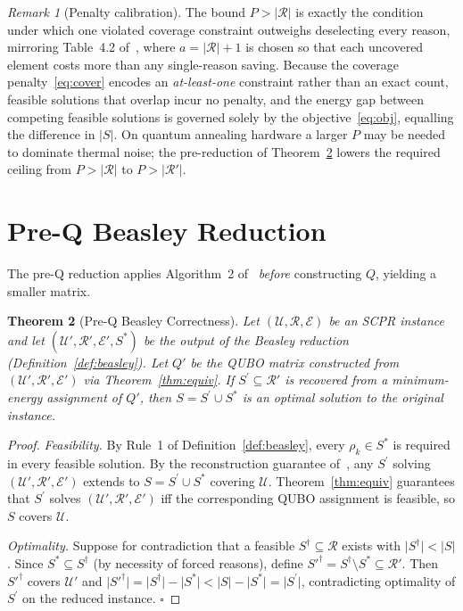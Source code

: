 \documentclass[11pt,a4paper]{article}
\theoremstyle{plain}
\newtheorem{theorem}{Theorem}[section]
\theoremstyle{definition}
\theoremstyle{remark}
\newtheorem{remark}[theorem]{Remark}
\newcommand{\U}{\mathcal{U}}
\newcommand{\R}{\mathcal{R}}
\newcommand{\E}{\mathcal{E}}
\newcommand{\Sstar}{S^{*}}
\newcommand{\Sprime}{S^{\prime}}
\newcommand{\SCPR}{\textup{SCPR}}
\newcommand{\QUBO}{\textup{QUBO}}
\newcommand{\abs}[1]{\lvert #1 \rvert}
\begin{document}
\begin{remark}[Penalty calibration]
The bound $P > \abs{\R}$ is exactly the condition under which one violated coverage
constraint outweighs deselecting every reason, mirroring Table~4.2
of~\cite{babatunde2025thesis}, where $a = \abs{\R} + 1$ is chosen so that each
uncovered element costs more than any single-reason saving. Because the coverage
penalty~\eqref{eq:cover} encodes an \emph{at-least-one} constraint rather than an
exact count, feasible solutions that overlap incur no penalty, and the energy gap
between competing feasible solutions is governed solely by the
objective~\eqref{eq:obj}, equalling the difference in $\abs{S}$. On quantum
annealing hardware a larger $P$ may be needed to dominate thermal noise; the
pre-reduction of Theorem~\ref{thm:preq} lowers the required ceiling from
$P > \abs{\R}$ to $P > \abs{\R'}$.
\end{remark}

\section{Pre-Q Beasley Reduction}
\label{sec:preq}

The pre-Q reduction applies Algorithm~2 of~\cite{babatunde2025thesis}
\emph{before} constructing $Q$, yielding a smaller matrix.

\begin{theorem}[Pre-Q Beasley Correctness]
\label{thm:preq}
Let $(\U, \R, \E)$ be an \SCPR{} instance and let
$(\U', \R', \E', \Sstar)$ be the output of the Beasley reduction
(Definition~\ref{def:beasley}).
Let $Q'$ be the \QUBO{} matrix constructed from $(\U', \R', \E')$ via
Theorem~\ref{thm:equiv}.
If $\Sprime \subseteq \R'$ is recovered from a minimum-energy assignment of $Q'$,
then $S = \Sprime \cup \Sstar$ is an optimal solution to the original instance.
\end{theorem}

\begin{proof}
\textit{Feasibility.}
By Rule~1 of Definition~\ref{def:beasley}, every $\rho_k \in \Sstar$ is required
in every feasible solution.
By the reconstruction guarantee of~\cite{babatunde2025thesis}, any $\Sprime$
solving $(\U', \R', \E')$ extends to $S = \Sprime \cup \Sstar$ covering $\U$.
Theorem~\ref{thm:equiv} guarantees that $\Sprime$ solves $(\U', \R', \E')$ iff
the corresponding \QUBO{} assignment is feasible, so $S$ covers $\U$.

\textit{Optimality.}
Suppose for contradiction that a feasible $S^\dagger \subseteq \R$ exists with
$\abs{S^\dagger} < \abs{S}$.
Since $\Sstar \subseteq S^\dagger$ (by necessity of forced reasons), define
$S'^\dagger = S^\dagger \setminus \Sstar \subseteq \R'$.
Then $S'^\dagger$ covers $\U'$ and
$\abs{S'^\dagger} = \abs{S^\dagger} - \abs{\Sstar} < \abs{S} - \abs{\Sstar} = \abs{\Sprime}$,
contradicting optimality of $\Sprime$ on the reduced instance. \hfill $\square$
\end{proof}
\end{document}
